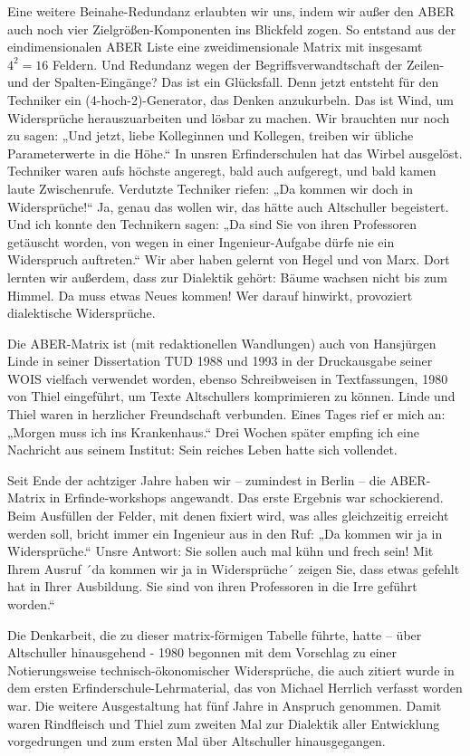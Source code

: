 \documentclass[12pt,a4paper]{article}
\begin{document}
Eine weitere Beinahe-Redundanz erlaubten wir uns, indem wir außer den ABER auch
noch vier Zielgrößen-Komponenten ins Blickfeld zogen. So entstand aus der
eindimensionalen ABER Liste eine zweidimensionale Matrix mit insgesamt $4^2=16$
Feldern. Und Redundanz wegen der Begriffsverwandtschaft der Zeilen- und der
Spalten-Eingänge? Das ist ein Glücksfall. Denn jetzt entsteht für den Techniker
ein (4-hoch-2)-Generator, das Denken anzukurbeln. Das ist Wind, um Widersprüche
herauszuarbeiten und lösbar zu machen. Wir brauchten nur noch zu sagen: „Und
jetzt, liebe Kolleginnen und Kollegen, treiben wir übliche Parameterwerte in
die Höhe.“ In unsren Erfinderschulen hat das Wirbel ausgelöst. Techniker waren
aufs höchste angeregt, bald auch aufgeregt, und bald kamen laute Zwischenrufe.
Verdutzte Techniker riefen: „Da kommen wir doch in Widersprüche!“ Ja, genau das
wollen wir, das hätte auch Altschuller begeistert. Und ich konnte den
Technikern sagen: „Da sind Sie von ihren Professoren getäuscht worden, von
wegen in einer Ingenieur-Aufgabe dürfe nie ein Widerspruch auftreten.“ Wir aber
haben gelernt von Hegel und von Marx. Dort lernten wir außerdem, dass zur
Dialektik gehört: Bäume wachsen nicht bis zum Himmel. Da muss etwas Neues
kommen! Wer darauf hinwirkt, provoziert dialektische Widersprüche.

Die ABER-Matrix ist (mit redaktionellen Wandlungen) auch von Hansjürgen Linde
in seiner Dissertation TUD 1988 und 1993 in der Druckausgabe seiner WOIS
vielfach verwendet worden, ebenso Schreibweisen in Textfassungen, 1980 von
Thiel eingeführt, um Texte Altschullers komprimieren zu können. Linde und Thiel
waren in herzlicher Freundschaft verbunden. Eines Tages rief er mich an:
„Morgen muss ich ins Krankenhaus.“ Drei Wochen später empfing ich eine
Nachricht aus seinem Institut: Sein reiches Leben hatte sich vollendet.

Seit Ende der achtziger Jahre haben wir – zumindest in Berlin – die ABER-Matrix
in Erfinde-workshops angewandt. Das erste Ergebnis war schockierend. Beim
Ausfüllen der Felder, mit denen fixiert wird, was alles gleichzeitig erreicht
werden soll, bricht immer ein Ingenieur aus in den Ruf: „Da kommen wir ja in
Widersprüche.“ Unsre Antwort: Sie sollen auch mal kühn und frech sein! Mit
Ihrem Ausruf ´da kommen wir ja in Widersprüche´ zeigen Sie, dass etwas gefehlt
hat in Ihrer Ausbildung. Sie sind von ihren Professoren in die Irre geführt
worden.“

Die Denkarbeit, die zu dieser matrix-förmigen Tabelle führte, hatte – über
Altschuller hinausgehend - 1980 begonnen mit dem Vorschlag zu einer
Notierungsweise technisch-ökonomischer Widersprüche, die auch zitiert wurde in
dem ersten Erfinderschule-Lehrmaterial, das von Michael Herrlich verfasst
worden war. Die weitere Ausgestaltung hat fünf Jahre in Anspruch
genommen. Damit waren Rindfleisch und Thiel zum zweiten Mal zur Dialektik aller
Entwicklung vorgedrungen und zum ersten Mal über Altschuller hinausgegangen.
\end{document}
